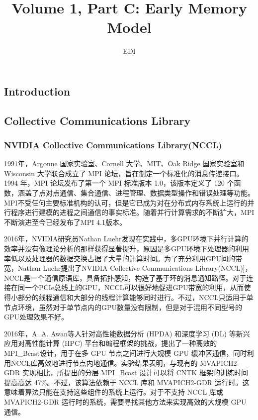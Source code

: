 \documentclass[a4paper,twoside]{scrbook}
\begin{document}
\begin{CJK}{UTF8}{gbsn}
\title{Volume 1, Part C: Early Memory Model}
\author{EDI}

\frontmatter
\maketitle
\tableofcontents
\mainmatter

\chapter{Introduction}
\section{Collective Communications Library}
\subsection{NVIDIA Collective Communications Library(NCCL)}
1991年，Argonne 国家实验室、Cornell 大学、MIT、Oak Ridge 国家实验室和 Wisconsin 大学联合成立了 MPI 论坛\cite{mpiforum}，旨在制定一个标准化的消息传递接口。1994 年，MPI 论坛发布了第一个 MPI 标准版本 1.0，该版本定义了 120 个函数，涵盖了点对点通信、集合通信、进程管理、数据类型操作和错误处理等功能。MPI不受任何主要标准机构的认可，但是它已成为对在分布式内存系统上运行的并行程序进行建模的进程之间通信的事实标准。随着并行计算需求的不断扩大，MPI不断演进至今已经发布了MPI 4.1版本。

2016年，NVIDIA研究员Nathan Luehr发现在实践中，多GPU环境下并行计算的效率并没有像理论分析的那样获得显著提升，原因是多GPU环境下处理器的利用率低以及处理器的数据交换占据了大量的计算时间。为了充分利用GPU间的带宽，Nathan Luehr提出了NVIDIA Collective Communications Library(NCCL)]\cite{nccl2016}，NCCL是一个通信原语库，具备拓扑感知，构造了基于环的消息通知路径。对于连接在同一个PCIe总线上的GPU，NCCL可以很好地促进GPU带宽的利用，从而使得小部分的线程通信和大部分的线程计算能够同时进行。不过，NCCL只适用于单节点环境，虽然对于单节点内的GPU数量没有限制，但是对于混用不同型号的GPU处理效果不好。

2016年，A. A. Awan\cite{awan2016}等人针对高性能数据分析 (HPDA) 和深度学习 (DL) 等新兴应用对高性能计算 (HPC) 平台和编程框架的挑战，提出了一种高效的 MPI\_Bcast设计，用于在多 GPU 节点之间进行大规模 GPU 缓冲区通信，同时利用NCCL库高效地进行节点内地通信。实验结果表明，与现有的 MVAPICH2-GDR 实现相比，所提出的分层 MPI\_Bcast 设计可以将 CNTK 框架的训练时间提高高达 47\%。不过，该算法依赖于 NCCL 库和 MVAPICH2-GDR 运行时。这意味着算法只能在支持这些组件的系统上运行。对于不支持 NCCL 库或 MVAPICH2-GDR 运行时的系统，需要寻找其他方法来实现高效的大规模 GPU 通信。


\end{CJK}
\end{document}
